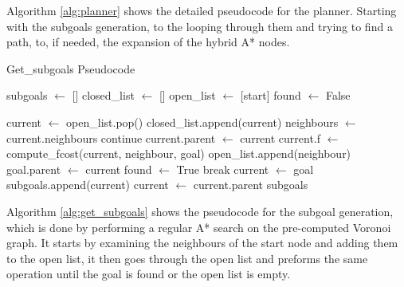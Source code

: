 Algorithm \ref{alg:planner} shows the detailed pseudocode for the planner. Starting 
with the subgoals generation, to the looping through them and trying to find a path, 
to, if needed, the expansion of the hybrid A* nodes.
\begin{algorithm}[h]
\caption{Get\_subgoals Pseudocode}
\label{alg:get_subgoals}
\begin{algorithmic}[1]
    \State subgoals $\gets$ []
    \State closed\_list $\gets$ []
    \State open\_list $\gets$ [start]
    \State found $\gets$ False

        \State current $\gets$ open\_list.pop()
        \State closed\_list.append(current)
        \State neighbours $ \gets$ current.neighbours
                        \State continue
                    \EndIf
                \EndIf
                \State current.parent $\gets$ current
                \State current.f $\gets$ compute\_fcost(current, neighbour, goal)
                \State open\_list.append(neighbour)
            \EndIf
                \State goal.parent $\gets$ current 
                \State found $\gets$ True
                break
            \EndIf
        \EndFor
    \EndWhile
        \State current $\gets$ goal
            \State subgoals.append(current)
            \State current $\gets$ current.parent
        \EndWhile
    \EndIf
    \State \Return subgoals
\EndFunction
\end{algorithmic}
\end{algorithm}

Algorithm \ref{alg:get_subgoals} shows the pseudocode for the subgoal generation, 
which is done by performing a regular A* search on the pre-computed Voronoi graph. 
It starts by examining the neighbours of the start node and adding them 
to the open list, it then goes through the open list and preforms the 
same operation until the goal is found or the open list is empty.

